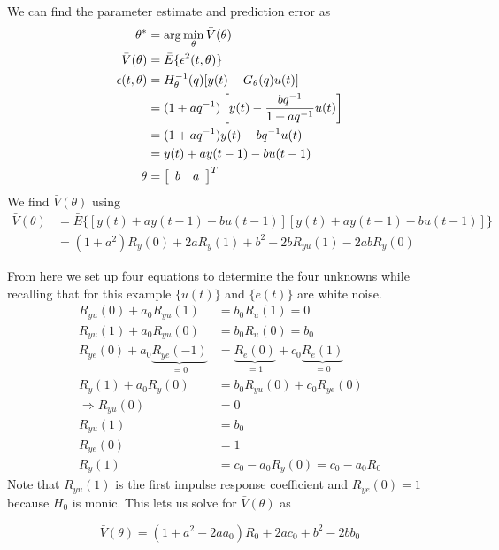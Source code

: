 \begin{example}
We can find the parameter estimate and prediction error as
\begin{align*}
\theta^\ast &= \arg\min_\theta\bar{V}(\theta) \\
\bar{V}(\theta) &= \bar{E}\{\epsilon^2(t,\theta)\} \\
\epsilon(t,\theta) &= H_\theta^{-1}(q)[y(t)-G_\theta(q)u(t)] \\
&= (1+aq^{-1})\left[y(t) - \frac{bq^{-1}}{1+aq^{-1}}u(t)\right] \\
&= (1+aq^{-1})y(t) - bq^{-1}u(t) \\
&= y(t)+ay(t-1)-bu(t-1) \\
\theta &= \left[\begin{array}{c c} b & a \end{array}\right]^T
\end{align*}
We find $\bar{V}(\theta)$ using
\begin{align*}
\bar{V}(\theta) &= \bar{E}\{[y(t)+ay(t-1)-bu(t-1)][y(t)+ay(t-1)-bu(t-1)]\} \\
&= (1+a^2)R_y(0) + 2aR_y(1) + b^2 - 2bR_{yu}(1) - 2abR_y(0)
\end{align*}

From here we set up four equations to determine the four unknowns while recalling that for this example $\{u(t)\}$ and $\{e(t)\}$ are white noise.
\begin{align*}
R_{yu}(0) + a_0R_{yu}(1) &= b_0R_u(1) = 0 \\
R_{yu}(1) + a_0R_{yu}(0) &= b_0R_u(0) = b_0 \\
R_{ye}(0) + a_0\underbrace{R_{ye}(-1)}_{=0} &= \underbrace{R_e(0)}_{=1} + c_0\underbrace{R_e(1)}_{=0} \\
R_y(1) + a_0R_y(0) &= b_0R_{yu}(0) + c_0R_{ye}(0) \\
\Rightarrow R_{yu}(0) &= 0 \\
R_{yu}(1) &= b_0 \\
R_{ye}(0) &= 1 \\
R_y(1) &= c_0-a_0R_y(0) = c_0-a_0R_0
\end{align*}
Note that $R_{yu}(1)$ is the first impulse response coefficient and $R_{ye}(0)=1$ because $H_0$ is monic.
This lets us solve for $\bar{V}(\theta)$ as

\begin{equation*}
\bar{V}(\theta) = (1+a^2-2aa_0)R_0+2ac_0 + b^2 - 2bb_0
\end{equation*}


\end{example}
